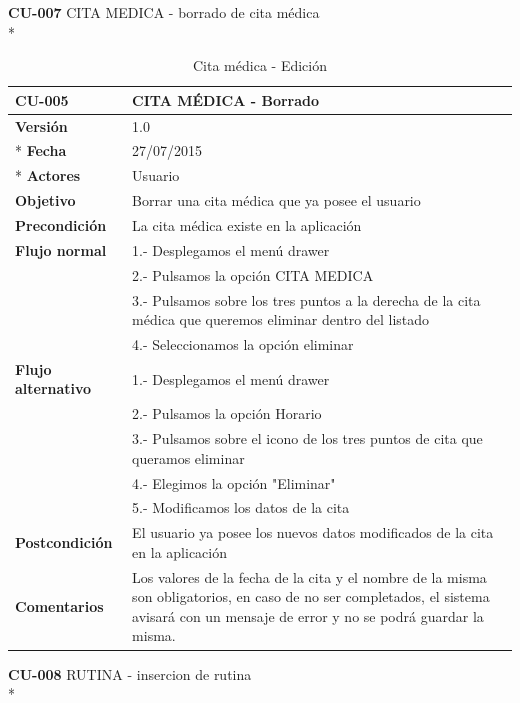 \documentclass[../pfc.tex]{subfiles}
\begin{document}
	
	
	\textbf{CU-007}	CITA MEDICA - borrado de cita médica\\*
	
		\begin{table}[!hbt]
			\centering
			\begin{tabular}[t]{|p{3cm}|p{9.5cm}|}
				\hline \textbf{CU-005} & \textbf{CITA MÉDICA - Borrado} \\*
				\hline\hline \textbf{Versión} & 1.0 \\ *
				\hline\hline \textbf{Fecha} & 27/07/2015 \\ *
				\hline\textbf{Actores} 	& Usuario\\*
				\hline \textbf{Objetivo} & Borrar una cita médica que ya posee el usuario\\* 			
				\hline \textbf{Precondición} & La cita médica existe en la aplicación\\* 
				\hline \textbf{Flujo normal} & 1.- Desplegamos el menú drawer \\* 
				& 2.- Pulsamos la opción CITA MEDICA\\*	
				& 3.- Pulsamos sobre los tres puntos a la derecha de la cita médica que queremos eliminar dentro del listado\\*	
				& 4.- Seleccionamos la opción eliminar\\*	
				\hline \textbf{Flujo alternativo} & 1.- Desplegamos el menú drawer \\* 
				& 2.- Pulsamos la opción Horario \\*	
				& 3.- Pulsamos sobre el icono de los tres puntos de cita que queramos eliminar \\*	
				& 4.- Elegimos la opción "Eliminar"\\*	
				& 5.- Modificamos los datos de la cita\\*	
				\hline \textbf{Postcondición} & El usuario ya posee los nuevos datos modificados de la cita en la aplicación \\* 
				\hline \textbf{Comentarios}   & Los valores de la fecha de la cita y el nombre de la misma son obligatorios, en caso de no ser completados, el sistema avisará con un mensaje de error y no se podrá guardar la misma.\\*
				\hline
			\end{tabular}
			\caption{Cita médica - Edición}
			\label{tabla:caso007}
		\end{table}
		
		
	
	\textbf{CU-008}	RUTINA - insercion de rutina\\*
	
\end{document}
